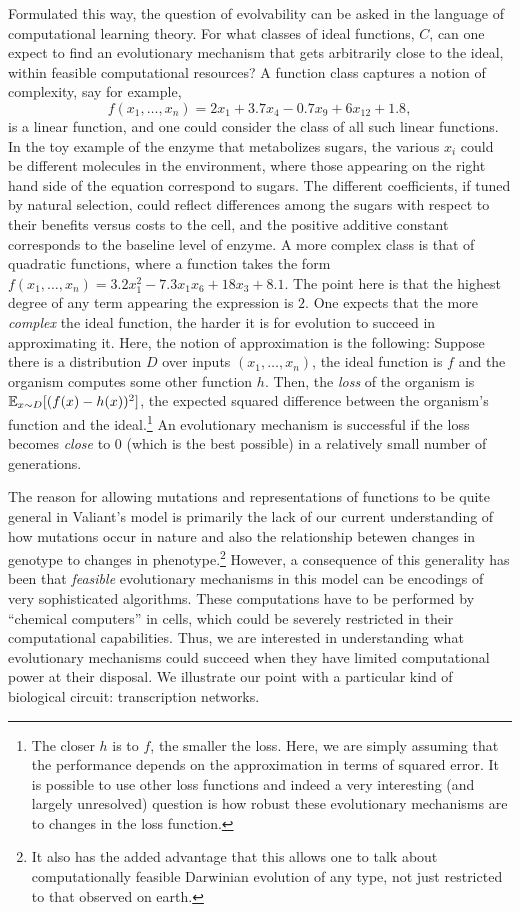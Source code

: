 \documentclass{acmtr2e}
\begin{document}
Formulated this way, the question of evolvability can be asked in the language
of computational learning theory. For what classes of ideal functions, $C$, can
one expect to find an evolutionary mechanism that gets arbitrarily close to the
ideal, within feasible computational resources? A function class captures a
notion of complexity, say for example,
\[ f(x_1, \ldots, x_n) = 2 x_1 + 3.7 x_4 - 0.7 x_9 + 6 x_{12} + 1.8, \]
is a linear function, and one could consider the class of all such linear
functions.
In the toy example of the enzyme that metabolizes sugars, the various $x_i$
could be different molecules in the environment, where those appearing on the
right hand side of the equation correspond to sugars. The different
coefficients, if tuned by natural selection, could reflect differences
among the sugars with respect to their benefits versus costs to the cell, and
the positive additive constant corresponds to the baseline level of enzyme.
A more complex class is that of quadratic functions, where a function
takes the form $f(x_1, \ldots, x_n) = 3.2 x_1^2 - 7.3 x_1 x_6 + 18 x_3 + 8.1$.
The point here is that the highest degree of any term appearing the expression
is $2$. One expects that the more \emph{complex} the ideal function, the harder
it is for evolution to succeed in approximating it. Here, the notion of
approximation is the following: Suppose there is a distribution $D$ over inputs
$(x_1, \ldots, x_n)$, the ideal function is $f$ and the organism computes some
other function $h$. Then, the \emph{loss} of the organism is $\mathbb{E}_{x \sim
D}[(f(x) - h(x))^2]$, the expected squared difference between the
organism's function and the ideal.\footnote{The closer $h$ is to $f$,
the smaller the loss. Here, we are simply assuming that the
performance depends on the approximation in terms of squared error. It is possible
to use other loss functions and indeed a very interesting (and largely
unresolved) question is how robust these evolutionary mechanisms are to changes
in the loss function.} An evolutionary mechanism is successful if the loss
becomes \emph{close} to $0$ (which is the best possible) in a relatively small
number of generations.

The reason for allowing mutations and representations of functions to be quite
general in Valiant's model is primarily the lack of our current understanding of
how mutations occur in nature and also the relationship betewen changes in genotype to
changes in phenotype.\footnote{It also has the added advantage that this allows
one to talk about computationally feasible Darwinian evolution of any type, not
just restricted to that observed on earth.} However, a consequence of this
generality has been that \emph{feasible} evolutionary mechanisms in this model
can be encodings of very sophisticated algorithms. These computations
have to be performed by ``chemical computers'' in cells, which could be severely
restricted in their computational capabilities. Thus, we are interested in
understanding what evolutionary mechanisms could succeed when they have limited
computational power at their disposal. We illustrate our point with a particular
kind of biological circuit: transcription networks.
\end{document}
